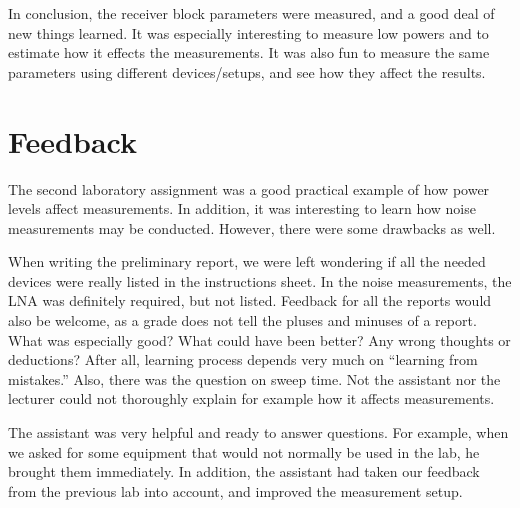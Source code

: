 \documentclass[a4paper, 12pt]{article}
\begin{document}
In conclusion, the receiver block parameters were measured, and a good deal of new things 
learned. It was especially interesting to measure low powers and to estimate how it effects 
the measurements. It was also fun to measure the same parameters using different devices/setups, 
and see how they affect the results.

\newpage
\section{Feedback}

The second laboratory assignment was a good practical example of how power levels affect 
measurements. In addition, it was interesting to learn how noise measurements may be conducted. 
However, there were some drawbacks as well.

When writing the preliminary report, we were left wondering if all the needed devices were 
really listed in the instructions sheet. In the noise measurements, the LNA was definitely 
required, but not listed. Feedback for all the reports would also be welcome, as a grade 
does not tell the pluses and minuses of a report. What was especially good? What could have 
been better? Any wrong thoughts or deductions? After all, learning process depends very much 
on ``learning from mistakes.'' Also, there was the question on sweep time. Not the assistant 
nor the lecturer could not thoroughly explain for example how it affects measurements.

The assistant was very helpful and ready to answer questions. For example, when we asked for 
some equipment that would not normally be used in the lab, he brought them immediately. In 
addition, the assistant had taken our feedback from the previous lab into account, and improved 
the measurement setup.
\end{document}
